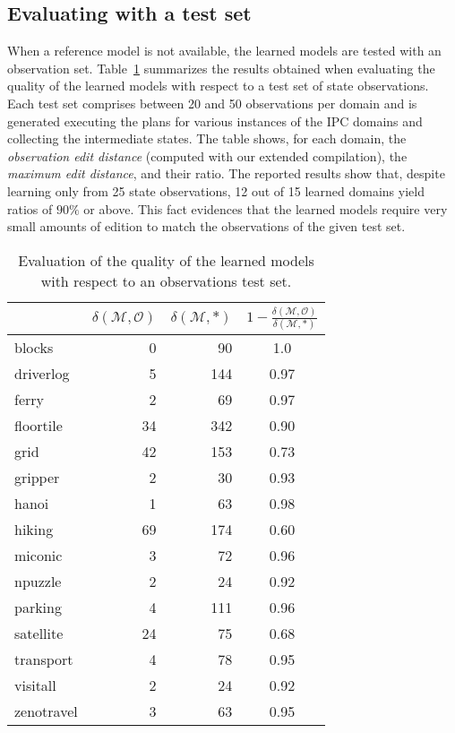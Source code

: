 \documentclass[3p,times]{elsarticle}
\begin{document}
\subsection{Evaluating with a test set}

When a reference model is not available, the learned models are tested with an observation set. Table~\ref{fig:observationstest} summarizes the results obtained when evaluating the quality of the learned models with respect to a test set of state observations. Each test set comprises between 20 and 50 observations per domain and is generated executing the plans for various instances of the IPC domains and collecting the intermediate states. The table shows, for each domain, the {\em observation edit distance} (computed with our extended compilation), the {\em maximum edit distance}, and their ratio. The reported results show that, despite learning only from 25 state observations, 12 out of 15 learned domains yield ratios of $90\%$ or above. This fact evidences that the learned models require very small amounts of edition to match the observations of the given test set.

\begin{table}[hbt!]
		\begin{center}
                \begin{footnotesize}
			\begin{tabular}{l|r|r|c|}
				& $\delta(\mathcal{M},\mathcal{O})$ & $\delta(\mathcal{M},*)$ & $1-\frac{\delta(\mathcal{M},\mathcal{O})}{\delta(\mathcal{M},*)}$ \\
				\hline
				blocks & 0 & 90 & 1.0 \\
				driverlog & 5 & 144 & 0.97 \\
				ferry & 2 & 69 & 0.97 \\
				floortile & 34 & 342 & 0.90 \\
				grid & 42 & 153 & 0.73 \\
				gripper & 2 & 30 & 0.93 \\
				hanoi & 1 & 63 & 0.98 \\
				hiking & 69 & 174 & 0.60 \\
				miconic & 3 & 72 & 0.96 \\
				npuzzle & 2 & 24 & 0.92 \\
                                parking & 4 & 111 & 0.96 \\
				satellite & 24 & 75 & 0.68 \\
				transport & 4 & 78 & 0.95 \\
				visitall & 2 & 24 & 0.92 \\
				zenotravel & 3 & 63 & 0.95
			\end{tabular}
                        	\end{footnotesize}
		\end{center}
	\caption{\small Evaluation of the quality of the learned models with respect to an observations test set.}
	\label{fig:observationstest}
\end{table}
\end{document}
